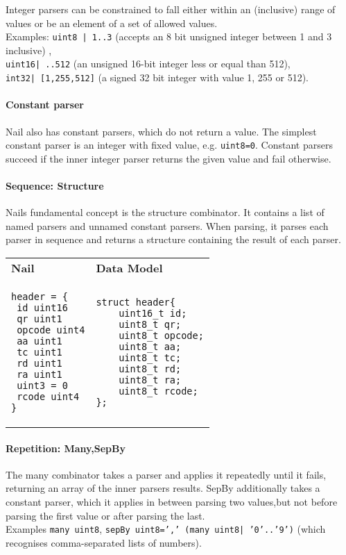 Integer parsers can be constrained to fall either within an (inclusive) range of values or be an
element of a set of allowed values. \\
Examples: \texttt{uint8 | 1..3} (accepts an 8 bit unsigned
integer between 1 and 3 inclusive) ,\\
 \texttt{uint16| ..512} (an unsigned 16-bit integer less or
equal than 512),\\
\texttt{int32| [1,255,512]} (a signed 32 bit integer with value 1, 255 or 512). 

\paragraph{Constant parser}
Nail also has constant parsers, which do not return a value. The simplest constant parser is an
integer with fixed value, e.g. \texttt{uint8=0}. Constant parsers succeed if the inner integer
parser returns the given value and fail otherwise. 


\paragraph{Sequence: Structure}
Nails fundamental concept is the structure combinator. It contains a list of named parsers and
unnamed constant parsers. 
When parsing, it parses each parser in sequence and returns a structure containing the result of
each parser.

\begin{tabular}{ll}
\textbf{Nail} & \textbf{Data Model}\\
\begin{minipage}{2in}
\begin{verbatim}
header = {
 id uint16
 qr uint1
 opcode uint4
 aa uint1 
 tc uint1
 rd uint1
 ra uint1
 uint3 = 0
 rcode uint4
}
\end{verbatim} 
\end{minipage}
 & 
\begin{minipage}{2in}
\begin{verbatim}
struct header{
    uint16_t id;
    uint8_t qr;
    uint8_t opcode;
    uint8_t aa;
    uint8_t tc;
    uint8_t rd;
    uint8_t ra;
    uint8_t rcode;
};
\end{verbatim} 
\end{minipage} 
\\
\end{tabular}
\paragraph{Repetition: Many,SepBy}
The many combinator takes a parser and applies it repeatedly until it fails, returning an array of
the inner parsers results. SepBy additionally takes a constant parser, which it applies in between
parsing two values,but not before parsing the first value or after parsing the last.\\
Examples \texttt{many uint8}, \texttt{sepBy uint8=',' (many uint8| '0'..'9')} (which recognises
comma-separated lists of numbers).

